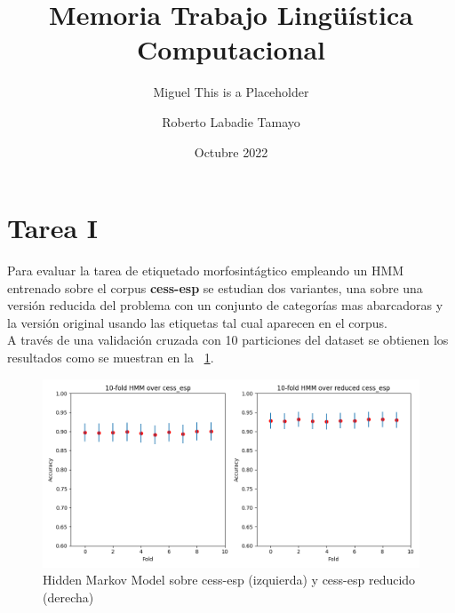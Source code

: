\documentclass[11pt,a4paper]{report}
\date{}
\begin{document}
\title{Memoria Trabajo Lingüística Computacional}
\author{  Miguel This is a Placeholder\and Roberto Labadie Tamayo}
	\date{Octubre 2022}
	\maketitle
	
	
	\section*{Tarea I}
		
		Para evaluar la tarea de etiquetado morfosintágtico empleando un HMM entrenado sobre el corpus \textbf{cess-esp} se estudian dos variantes, una sobre una versión reducida del problema con un conjunto de categorías mas abarcadoras y la versión original usando las etiquetas tal cual aparecen en el corpus.
		\\
		A través de una validación cruzada con 10 particiones del dataset se obtienen los resultados como se muestran en la \figurename~\ref{HMM_task1}.
		
		\begin{figure}[!thb]
		\begin{center}
			\includegraphics[scale=0.6]{images/HMM_task1.png}
		\end{center}
		\caption{Hidden Markov Model sobre cess-esp (izquierda) y cess-esp reducido (derecha) }
		\label{HMM_task1}
	\end{figure}
	
\end{document}
